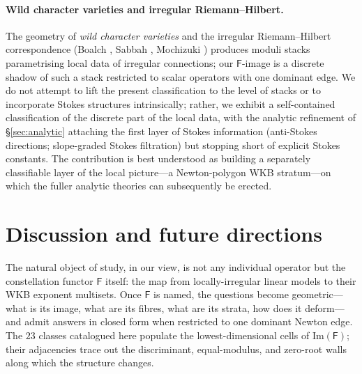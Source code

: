 \documentclass[aip,jmp,preprint,amsmath,amssymb,nofootinbib,floatfix]{revtex4-2}
\theoremstyle{plain}
\theoremstyle{definition}
\theoremstyle{remark}
\newcommand{\Fclass}{\mathsf{F}}
\begin{document}
\paragraph{Wild character varieties and irregular Riemann--Hilbert.}
The geometry of \emph{wild character varieties} and the irregular
Riemann--Hilbert correspondence (Boalch
\cite{boalch-stokes,boalch-wildhodge}, Sabbah \cite{sabbah-polarizable},
Mochizuki \cite{mochizuki-asymptotic}) produces moduli stacks parametrising
local data of irregular connections; our $\Fclass$-image is a discrete
shadow of such a stack restricted to scalar operators with one dominant
edge. We do not attempt to lift the present classification to the level
of stacks or to incorporate Stokes structures intrinsically; rather, we
exhibit a self-contained classification of the discrete part of the local
data, with the analytic refinement of \S\ref{sec:analytic} attaching the
first layer of Stokes information (anti-Stokes directions; slope-graded
Stokes filtration) but stopping short of explicit Stokes constants. The
contribution is best understood as building a separately classifiable
layer of the local picture---a Newton-polygon WKB stratum---on which the
fuller analytic theories can subsequently be erected.


\section{Discussion and future directions}\label{sec:vision}

The natural object of study, in our view, is not any individual operator
but the constellation functor $\Fclass$ itself: the map from
locally-irregular linear models to their WKB exponent multisets. Once
$\Fclass$ is named, the questions become geometric---what is its image,
what are its fibres, what are its strata, how does it deform---and admit
answers in closed form when restricted to one dominant Newton edge. The
$23$ classes catalogued here populate the lowest-dimensional cells of
$\mathrm{Im}(\Fclass)$; their adjacencies trace out the discriminant,
equal-modulus, and zero-root walls along which the structure changes.
\end{document}

